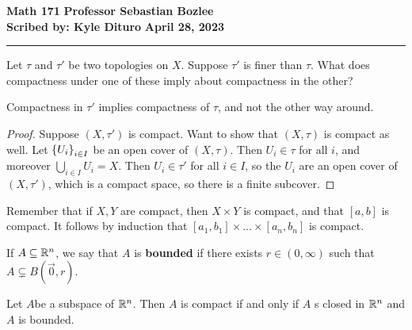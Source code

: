 \documentclass[12pt, twosided]{article}
\begin{document}
\noindent \textbf{Math 171} \hfill \textbf{Professor Sebastian Bozlee} \\
\textbf{Scribed by: Kyle Dituro} \hfill \textbf{April 28, 2023}\hrule
\vspace{.2in}

\begin{exr}
  Let \(\tau\) and \(\tau\prime\) be two topologies on \(X\). Suppose \(\tau\prime\) is finer than \(\tau\). What does compactness under one of these imply about compactness in the other?
\end{exr}

Compactness in \(\tau\prime\) implies compactness of \(\tau\), and not the other way around.

\begin{proof}
  Suppose \((X, \tau\prime)\) is compact. Want to show that \((X, \tau)\) is compact as well. Let \(\left\{ U_i \right\}_{i \in I}\) be an open cover of \((X, \tau)\). Then \(U_i \in \tau\) for all \(i\), and moreover \(\bigcup_{i \in I} U_i = X\). Then \(U_i \in \tau\prime\) for all \(i \in I\), so the \(U_i\) are an open cover of \((X, \tau\prime)\), which is a compact space, so there is a finite subcover.
\end{proof}

Remember that if \(X, Y\) are compact, then \(X \times Y\) is compact, and that \([a,b]\) is compact. It follows by induction that \([a_1, b_1] \times \ldots \times [a_n, b_n]\) is compact.

\begin{df}
  If \(A \subseteq \mathbb{R}^n\), we say that \(A\) is \textbf{bounded} if there exists \(r \in (0, \infty)\) such that \(A \subsetneq B(\vec{0}, r)\).
\end{df}

\begin{thm}
  Let \(A\)be a subspace of \(\mathbb{R}^n\). Then \(A\) is compact if and only if \(A\) s closed in \(\mathbb{R}^n\) and \(A\) is bounded.
\end{thm}
\end{document}
